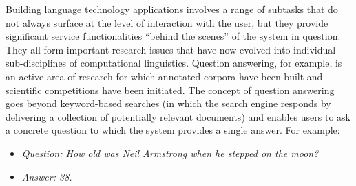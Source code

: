 \documentclass[]{../../metanetpaper}
\begin{document}
\begin{multicols}{2}
Building language technology applications involves a range of subtasks that do not always surface at the level of interaction with the user, but they provide significant service functionalities “behind the scenes” of the system in question. They all form important research issues that have now evolved into individual sub-disciplines of computational linguistics. Question answering, for example, is an active area of research for which annotated corpora have been built and scientific competitions have been initiated. The concept of question answering goes beyond keyword-based searches (in which the search engine responds by delivering a collection of potentially relevant documents) and enables users to ask a concrete question to which the system provides a single answer. For example:

\begin{itemize}
\item[] \textit{Question: How old was Neil Armstrong when he stepped on the moon?}
\item[] \textit{Answer: 38.}
\end{itemize}


\end{multicols}
\end{document}
